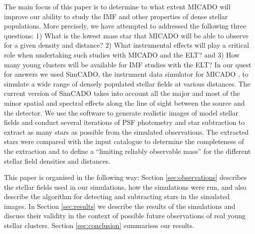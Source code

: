 The main focus of this paper is to determine to what extent MICADO will improve our ability to study the IMF and other properties of dense stellar populations. More precisely, we have attempted to addressed the following three questions: 
1) What is the lowest mass star that MICADO will be able to observe for a given density and distance? 
2) What instrumental effects will play a critical role when undertaking such studies with MICADO and the ELT? and
3) How many young clusters will be available for IMF studies with the ELT? 
In our quest for answers we used SimCADO, the instrument data simulator for MICADO \citep{leschinski2016}, to simulate a wide range of densely populated stellar fields at various distances. 
The current version of SimCADO takes into account all the major and most of the minor spatial and spectral effects along the line of sight between the source and the detector. 
We use the software to generate realistic images of model stellar fields and  conduct several iterations of PSF photometry and star subtraction to extract as many stars as possible from the simulated observations. 
The extracted stars were compared with the input catalogue to determine the completeness of the extraction and to define a ``limiting reliably observable mass'' for the different stellar field densities and distances.

This paper is organised in the following way: Section \ref{sec:observations} describes the stellar fields used in our simulations, how the simulations were run, and also describe the algorithm for detecting and subtracting stars in the simulated images. 
In Section \ref{sec:results} we describe the results of the simulations and discuss their validity in the context of possible future observations of real young stellar clusters. 
Section \ref{sec:conclusion} summarises our results.
